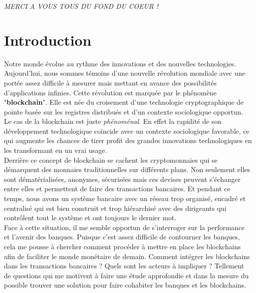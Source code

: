 \documentclass[12pt]{report}
\begin{document}
  \begin{flushright} \large
    \emph{MERCI A VOUS TOUS DU FOND DU COEUR !} \\
  \end{flushright}


\newpage
\renewcommand{\contentsname}{Table des matières}
\tableofcontents
\pagebreak


\section{Introduction}
\hspace{1cm} Notre monde évolue au rythme des innovations et des nouvelles technologies. Aujourd'hui, nous sommes témoins d'une nouvelle révolution mondiale avec une portée assez difficile à mesurer mais mettant en avance des possibilités d'applications infinies. Cette révolution est marquée par le phénomène "\textbf{blockchain}". Elle est née du croisement d'une technologie cryptographique de pointe basée sur les registres distribués et d'un contexte sociologique opportun. Le cas de la blockchain est juste \textit{phénoménal}. En effet la rapidité de son développement technologique coïncide avec un contexte sociologique favorable, ce qui augmente les chances de tirer profit des grandes innovations technologiques en les transformant en un vrai usage. \\

\hspace{1cm} Derrière ce concept de blockchain se cachent les cryptomonnaies qui se \\démarquent des monnaies traditionnelles sur différents plans. Non seulement elles sont dématérialisées, anonymes, sécurisées mais ces devises peuvent s'échanger entre elles et permettent de faire des transactions bancaires. Et pendant ce temps, nous avons un système bancaire avec un réseau trop organisé, encadré et centralisé qui est bien construit et trop hiérarchisé avec des dirigeants qui contrôlent tout le système et ont toujours le dernier mot.\\

\hspace{1cm} Face à cette situation, il me semble opportun de s'interroger sur la performance et l'avenir des banques. Puisque c'est assez difficile de contourner les banques, cela me pousse à chercher comment procéder à mettre en place les blockchains afin de faciliter le monde monétaire de demain. Comment intégrer les blockchains dans les transactions bancaires ? Quels sont les acteurs à impliquer ? Tellement de questions qui me motivent à faire une étude approfondie et dans la mesure du possible trouver une solution pour faire cohabiter les banques et les blockchains.\\
\end{document}
